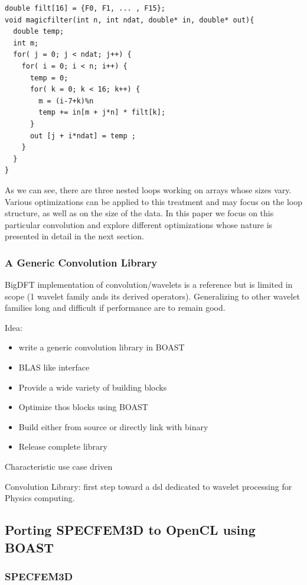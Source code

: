 \documentclass[review]{elsarticle}
\begin{document}
\begin{lstlisting}
double filt[16] = {F0, F1, ... , F15};
void magicfilter(int n, int ndat, double* in, double* out){
  double temp;
  int m;
  for( j = 0; j < ndat; j++) {
    for( i = 0; i < n; i++) {
      temp = 0;
      for( k = 0; k < 16; k++) {
        m = (i-7+k)%n
        temp += in[m + j*n] * filt[k];
      }
      out [j + i*ndat] = temp ;
    } 
  }
} 
\end{lstlisting}

As we can see, there are three nested loops working on arrays whose sizes
vary.  Various optimizations can be applied to this treatment and
may focus on the loop structure, as well as on the size of the data.  In this
paper we focus on this particular convolution and explore different
optimizations whose nature is presented in detail in the next section.

    \subsubsection{A Generic Convolution Library}

  BigDFT implementation of convolution/wavelets is a reference but is limited in scope (1 wavelet family ands its derived operators).
  Generalizing to other wavelet families long and difficult if performance are to remain good.

Idea:
\begin{itemize}
\item write a generic convolution library in BOAST
\item BLAS like interface
\item Provide a wide variety of building blocks
\item Optimize thos blocks using BOAST
\item Build either from source or directly link with binary
\item Release complete library
\end{itemize}


  Characteristic use case driven

  Convolution Library: first step toward a dsl dedicated to wavelet processing for Physics computing.

  \subsection{Porting SPECFEM3D to OpenCL using BOAST}

    \subsubsection{SPECFEM3D}
\end{document}
